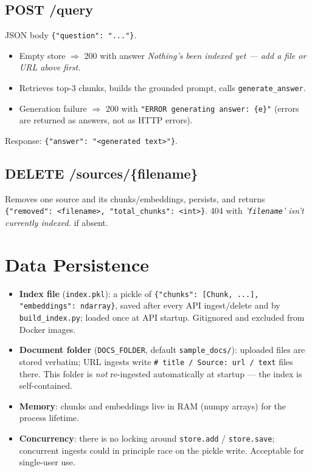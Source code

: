 \documentclass[11pt,a4paper]{article}
\newcommand{\code}[1]{\texttt{#1}}
\begin{document}
\subsection{POST /query}
JSON body \code{\{"question": "..."\}}.
\begin{itemize}
  \item Empty store $\Rightarrow$ 200 with answer \emph{Nothing's been
        indexed yet --- add a file or URL above first.}
  \item Retrieves top-3 chunks, builds the grounded prompt, calls
        \code{generate\_answer}.
  \item Generation failure $\Rightarrow$ 200 with
        \code{"ERROR generating answer: \{e\}"} (errors are returned as
        answers, not as HTTP errors).
\end{itemize}
Response: \code{\{"answer": "<generated text>"\}}.

\subsection{DELETE /sources/\{filename\}}
Removes one source and its chunks/embeddings, persists, and returns
\code{\{"removed": <filename>, "total_chunks": <int>\}}. 404 with
\emph{'\texttt{filename}' isn't currently indexed.} if absent.

\section{Data Persistence}
\begin{itemize}
  \item \textbf{Index file} (\code{index.pkl}): a pickle of
        \code{\{"chunks": [Chunk, ...], "embeddings": ndarray\}}, saved after
        every API ingest/delete and by \code{build\_index.py}; loaded once at
        API startup. Gitignored and excluded from Docker images.
  \item \textbf{Document folder} (\code{DOCS\_FOLDER}, default
        \code{sample\_docs/}): uploaded files are stored verbatim; URL
        ingests write \code{\# title / Source: url / text} files there. This
        folder is \emph{not} re-ingested automatically at startup --- the
        index is self-contained.
  \item \textbf{Memory}: chunks and embeddings live in RAM (numpy arrays)
        for the process lifetime.
  \item \textbf{Concurrency}: there is no locking around \code{store.add} /
        \code{store.save}; concurrent ingests could in principle race on the
        pickle write. Acceptable for single-user use.
\end{itemize}
\end{document}
